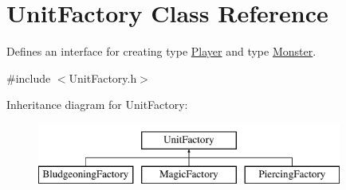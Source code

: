\hypertarget{class_unit_factory}{}\section{Unit\+Factory Class Reference}
\label{class_unit_factory}


Defines an interface for creating type \hyperlink{class_player}{Player} and type \hyperlink{class_monster}{Monster}.  




{\ttfamily \#include $<$Unit\+Factory.\+h$>$}

Inheritance diagram for Unit\+Factory\+:\begin{figure}[H]
\begin{center}
\leavevmode
\includegraphics[height=2.000000cm]{class_unit_factory}
\end{center}
\end{figure}
